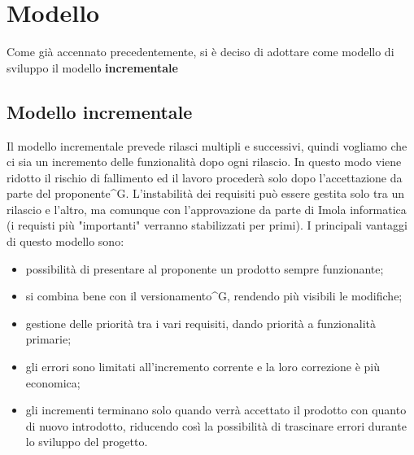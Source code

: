 \chapter{Modello}
Come già accennato precedentemente, si è deciso di adottare come modello di sviluppo il modello \textbf{incrementale}
\section{Modello incrementale}
Il modello incrementale prevede rilasci multipli e successivi, quindi vogliamo che ci sia un incremento delle funzionalità dopo ogni rilascio. In questo modo viene ridotto il rischio di fallimento ed il lavoro procederà solo dopo l’accettazione da parte del proponente^{G}. L’instabilità dei requisiti può essere gestita solo tra un rilascio e l’altro, ma comunque con l’approvazione da parte di Imola informatica (i requisti più "importanti" verranno stabilizzati per primi). I principali vantaggi di questo modello sono:
\begin{itemize}
    \item possibilità di presentare al proponente un prodotto sempre funzionante;
    \item si combina bene con il versionamento^{G}, rendendo più visibili le modifiche;
    \item gestione delle priorità tra i vari requisiti, dando priorità a funzionalità primarie;
    \item gli errori sono limitati all’incremento corrente e la loro correzione è più economica;
    \item gli incrementi terminano solo quando verrà accettato il prodotto con quanto di nuovo introdotto, riducendo così la possibilità di trascinare errori durante lo sviluppo del progetto.
\end{itemize}